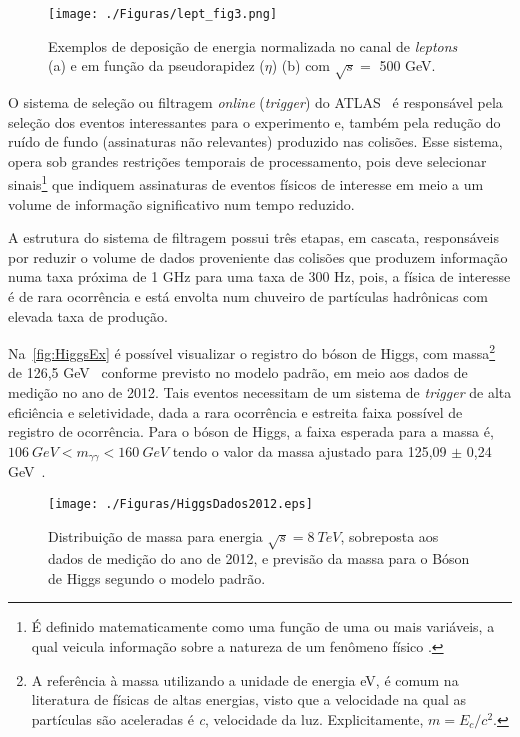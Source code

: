 \begin{figure}[H]
	\begin{center}         
		\caption{Exemplos de deposição de energia normalizada no canal de \textit{leptons} (a) e em função da pseudorapidez ($\eta$) (b) com $\sqrt{s}=$ 500 GeV.}
		\texttt{[image: ./Figuras/lept\_fig3.png]}
		\label{fig:perfil}
	\end{center}
\end{figure}


O sistema de seleção ou filtragem \emph{online} (\emph{trigger}) do ATLAS~\cite{anjos2006} é responsável pela seleção dos eventos interessantes para o experimento e, também pela redução do ruído de fundo (assinaturas não relevantes) produzido nas colisões. Esse sistema, opera sob grandes restrições temporais de processamento, pois deve selecionar sinais\footnote{É definido matematicamente como uma função de uma ou mais variáveis, a qual veicula informação sobre a natureza de um fenômeno físico \cite{book:simon2001}.} que indiquem assinaturas de eventos físicos de interesse em meio a um volume de informação significativo num tempo reduzido.

A estrutura do sistema de filtragem possui três etapas, em cascata, responsáveis por reduzir o volume de dados proveniente das colisões que produzem informação numa taxa próxima de 1 GHz para uma taxa de 300 Hz, pois, a física de interesse é de rara ocorrência e está envolta num chuveiro de partículas hadrônicas com elevada taxa de produção. 

Na~\autoref{fig:HiggsEx} é possível visualizar o registro do bóson de Higgs, com massa\footnote{A referência à massa utilizando a unidade de energia eV, é comum na literatura de físicas de altas energias, visto que a velocidade na qual as partículas são aceleradas é \textit{c}, velocidade da luz. Explicitamente, $m = E_c/c^2$.} de 126,5 GeV~\cite{atlas2012} conforme previsto no modelo padrão, em meio aos dados de medição no ano de 2012. Tais eventos necessitam de um sistema de \textit{trigger} de alta eficiência e seletividade, dada a rara ocorrência e estreita faixa possível de registro de ocorrência. Para o bóson de Higgs, a faixa esperada para a massa é, $106\ GeV < m_{\gamma \gamma} < 160\ GeV$ tendo o valor da massa  ajustado para 125,09 $\pm$ 0,24 GeV~\cite[p. 5]{Aad2015}.

\begin{figure}[H]
	\begin{center}         
		\caption{Distribuição de massa para energia $\sqrt{s}=8\ TeV$, sobreposta aos dados de medição do ano de 2012, e previsão da massa para o Bóson de Higgs segundo o modelo padrão.}
		\texttt{[image: ./Figuras/HiggsDados2012.eps]}
		\label{fig:HiggsEx}
	\end{center}
\end{figure}

